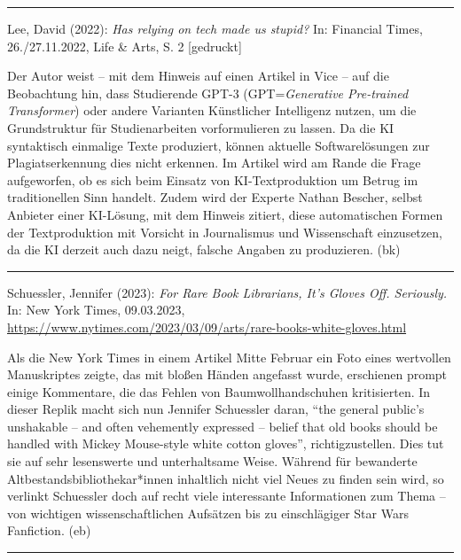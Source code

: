 \documentclass[a4paper,
fontsize=11pt,
oneside,
numbers=noperiodatend,
parskip=half-,
bibliography=totoc,
final
]{scrartcl}
\begin{document}
\begin{center}\rule{0.5\linewidth}{0.5pt}\end{center}

Lee, David (2022): \emph{Has relying on tech made us stupid?} In:
Financial Times, 26./27.11.2022, Life \& Arts, S. 2 {[}gedruckt{]}

Der Autor weist -- mit dem Hinweis auf einen Artikel in Vice -- auf die
Beobachtung hin, dass Studierende GPT-3 (GPT=\emph{Generative
Pre-trained Transformer}) oder andere Varianten Künstlicher Intelligenz
nutzen, um die Grundstruktur für Studienarbeiten vorformulieren zu
lassen. Da die KI syntaktisch einmalige Texte produziert, können
aktuelle Softwarelösungen zur Plagiatserkennung dies nicht erkennen. Im
Artikel wird am Rande die Frage aufgeworfen, ob es sich beim Einsatz von
KI-Textproduktion um Betrug im traditionellen Sinn handelt. Zudem wird
der Experte Nathan Bescher, selbst Anbieter einer KI-Lösung, mit dem
Hinweis zitiert, diese automatischen Formen der Textproduktion mit
Vorsicht in Journalismus und Wissenschaft einzusetzen, da die KI derzeit
auch dazu neigt, falsche Angaben zu produzieren. (bk)

\begin{center}\rule{0.5\linewidth}{0.5pt}\end{center}

Schuessler, Jennifer (2023): \emph{For Rare Book Librarians, It's Gloves
Off. Seriously.} In: New York Times, 09.03.2023,
\url{https://www.nytimes.com/2023/03/09/arts/rare-books-white-gloves.html}

Als die New York Times in einem Artikel Mitte Februar ein Foto eines
wertvollen Manuskriptes zeigte, das mit bloßen Händen angefasst wurde,
erschienen prompt einige Kommentare, die das Fehlen von
Baumwollhandschuhen kritisierten. In dieser Replik macht sich nun
Jennifer Schuessler daran, \enquote{the general public's unshakable --
and often vehemently expressed -- belief that old books should be
handled with Mickey Mouse-style white cotton gloves}, richtigzustellen.
Dies tut sie auf sehr lesenswerte und unterhaltsame Weise. Während für
bewanderte Altbestandsbibliothekar*innen inhaltlich nicht viel Neues zu
finden sein wird, so verlinkt Schuessler doch auf recht viele
interessante Informationen zum Thema -- von wichtigen wissenschaftlichen
Aufsätzen bis zu einschlägiger Star Wars Fanfiction. (eb)

\begin{center}\rule{0.5\linewidth}{0.5pt}\end{center}
\end{document}
